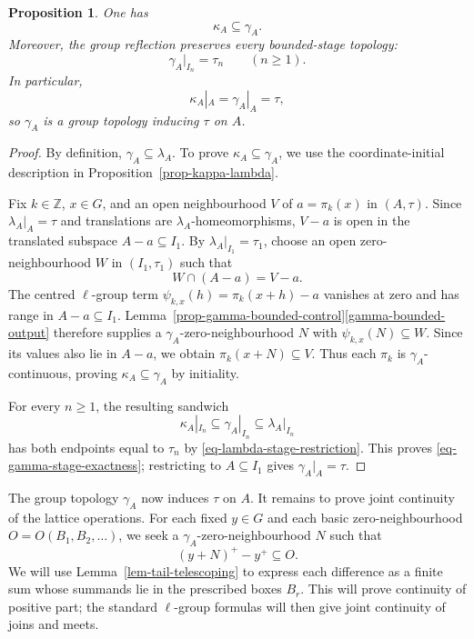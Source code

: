 \documentclass[preprint,3p]{elsarticle}
\theoremstyle{plain}
\newtheorem{prop}[thm]{Proposition}
\theoremstyle{definition}
\numberwithin{equation}{section}
\begin{document}
\begin{prop}
\label{prop-kappa-rho-gamma}
One has
\[
 \kappa_A\subseteq\gamma_A.
\]
Moreover, the group reflection preserves every bounded-stage topology:
\begin{equation}
\label{eq-gamma-stage-exactness}
 \gamma_A|_{I_n}=\tau_n
 \qquad(n\geq1).
\end{equation}
In particular,
\[
 \kappa_A|_A=\gamma_A|_A=\tau,
\]
so $\gamma_A$ is a group topology inducing $\tau$ on $A$.
\end{prop}

\begin{proof}
By definition, $\gamma_A\subseteq\lambda_A$.
To prove $\kappa_A\subseteq\gamma_A$, we use the coordinate-initial
description in Proposition~\ref{prop-kappa-lambda}.

Fix $k\in\mathbb Z$, $x\in G$, and an open neighbourhood $V$
of $a=\pi_k(x)$ in $(A,\tau)$.
Since $\lambda_A|_A=\tau$ and translations are
$\lambda_A$-homeomorphisms, $V-a$ is open in the translated
subspace $A-a\subseteq I_1$.
By $\lambda_A|_{I_1}=\tau_1$, choose an open zero-neighbourhood
$W$ in $(I_1,\tau_1)$ such that
\[
 W\cap(A-a)=V-a.
\]
The centred $\ell$-group term
$\psi_{k,x}(h)=\pi_k(x+h)-a$ vanishes at zero and has range in
$A-a\subseteq I_1$.
Lemma~\ref{prop-gamma-bounded-control}\ref{gamma-bounded-output} therefore supplies a
$\gamma_A$-zero-neighbourhood $N$ with $\psi_{k,x}(N)\subseteq W$.
Since its values also lie in $A-a$, we obtain
$\pi_k(x+N)\subseteq V$.
Thus each $\pi_k$ is $\gamma_A$-continuous, proving
$\kappa_A\subseteq\gamma_A$ by initiality.

For every $n\geq1$, the resulting sandwich
\[
 \kappa_A|_{I_n}\subseteq\gamma_A|_{I_n}
 \subseteq\lambda_A|_{I_n}
\]
has both endpoints equal to $\tau_n$ by
\eqref{eq-lambda-stage-restriction}.
This proves \eqref{eq-gamma-stage-exactness}; restricting to
$A\subseteq I_1$ gives $\gamma_A|_A=\tau$.
\end{proof}

The group topology $\gamma_A$ now induces $\tau$ on $A$.
It remains to prove joint continuity of the lattice operations.
For each fixed $y\in G$ and each basic zero-neighbourhood
$O=O(B_1,B_2,\ldots)$, we seek a $\gamma_A$-zero-neighbourhood $N$ such that
\[
 (y+N)^+-y^+\subseteq O.
\]
We will use Lemma~\ref{lem-tail-telescoping} to express each difference
as a finite sum whose summands lie in the prescribed boxes $B_r$.
This will prove continuity of positive part; the standard $\ell$-group
formulas will then give joint continuity of joins and meets.
\end{document}
